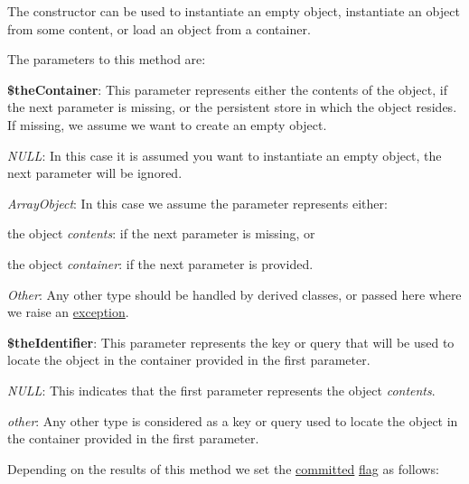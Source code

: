 The constructor can be used to instantiate an empty object, instantiate an object from some content, or load an object from a container.

The parameters to this method are\-:


\begin{DoxyItemize}
\item {\bfseries \$the\-Container}\-: This parameter represents either the contents of the object, if the next parameter is missing, or the persistent store in which the object resides. If missing, we assume we want to create an empty object. 
\begin{DoxyItemize}
\item {\itshape N\-U\-L\-L\/}\-: In this case it is assumed you want to instantiate an empty object, the next parameter will be ignored. 
\item {\itshape Array\-Object\/}\-: In this case we assume the parameter represents either\-: 
\begin{DoxyItemize}
\item the object {\itshape contents\/}\-: if the next parameter is missing, or 
\item the object {\itshape container\/}\-: if the next parameter is provided. 
\end{DoxyItemize}
\item {\itshape Other\/}\-: Any other type should be handled by derived classes, or passed here where we raise an \hyperlink{}{exception}. 
\end{DoxyItemize}
\item {\bfseries \$the\-Identifier}\-: This parameter represents the key or query that will be used to locate the object in the container provided in the first parameter. 
\begin{DoxyItemize}
\item {\itshape N\-U\-L\-L\/}\-: This indicates that the first parameter represents the object {\itshape contents\/}. 
\item {\itshape other\/}\-: Any other type is considered as a key or query used to locate the object in the container provided in the first parameter. 
\end{DoxyItemize}
\end{DoxyItemize}

Depending on the results of this method we set the \hyperlink{class_c_persistent_object_a6520a7bcecf3f39fd61ec6d08f736e77}{committed} \hyperlink{}{flag} as follows\-:


